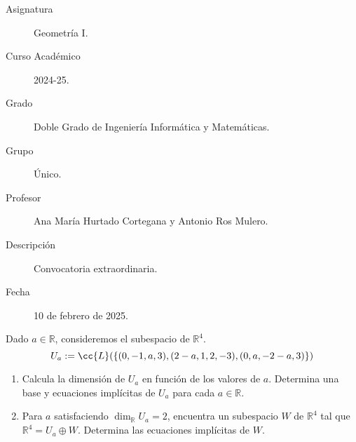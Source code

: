 \documentclass[12pt]{article}
\begin{document}
	
	\newcommand{\R}{{\mathbb{R}}} %
	\newcommand{\K}{{\mathbb{K}}} %
	
	
	
	\begin{description}
		\item[Asignatura] Geometría I.
		\item[Curso Académico] 2024-25.
		\item[Grado] Doble Grado de Ingeniería Informática y Matemáticas.
		\item[Grupo] Único.
		\item[Profesor] Ana María Hurtado Cortegana y Antonio Ros Mulero.
		\item[Descripción] Convocatoria extraordinaria.
		\item[Fecha] 10 de febrero de 2025.    
	\end{description}
	\newpage
	
	\begin{ejercicio}[2.5 puntos] Dado $a \in \R$, consideremos el subespacio de $\R^4$.
		\begin{equation*}
			U_a := \cc{L}(\{(0, -1, a, 3), (2-a, 1, 2, -3), (0, a, -2-a, 3)\})
		\end{equation*}
		
		\begin{enumerate} 
			\item Calcula la dimensión de $U_a$ en función de los valores de $a$. Determina una base y ecuaciones
			implícitas de $U_a$ para cada $a \in \R$.
			\item Para $a$ satisfaciendo $\dim_{\R} U_a = 2$, encuentra un subespacio $W$ de $\R^4$ tal que $\R^4 = U_a\oplus W$. Determina las ecuaciones implícitas de $W$.
		\end{enumerate}
	\end{ejercicio}
		
\end{document}
